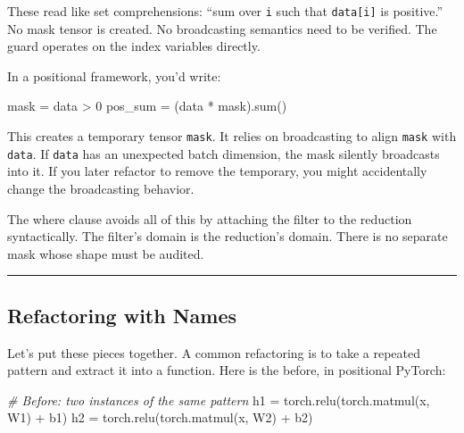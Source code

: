 \documentclass[11pt,]{article}
\newenvironment{Shaded}{}{}
\newcommand{\BuiltInTok}[1]{#1}
\newcommand{\CommentTok}[1]{\textcolor[rgb]{0.38,0.63,0.69}{\textit{#1}}}
\newcommand{\DecValTok}[1]{\textcolor[rgb]{0.25,0.63,0.44}{#1}}
\newcommand{\NormalTok}[1]{#1}
\newcommand{\OperatorTok}[1]{\textcolor[rgb]{0.40,0.40,0.40}{#1}}
\begin{document}
These read like set comprehensions: ``sum over \texttt{i} such that
\texttt{data{[}i{]}} is positive.'' No mask tensor is created. No
broadcasting semantics need to be verified. The guard operates on the
index variables directly.

In a positional framework, you'd write:

\begin{Shaded}
\begin{Highlighting}[]
\NormalTok{mask }\OperatorTok{=}\NormalTok{ data }\OperatorTok{>} \DecValTok{0}
\NormalTok{pos_sum }\OperatorTok{=}\NormalTok{ (data }\OperatorTok{*}\NormalTok{ mask).}\BuiltInTok{sum}\NormalTok{()}
\end{Highlighting}
\end{Shaded}

This creates a temporary tensor \texttt{mask}. It relies on broadcasting
to align \texttt{mask} with \texttt{data}. If \texttt{data} has an
unexpected batch dimension, the mask silently broadcasts into it. If you
later refactor to remove the temporary, you might accidentally change
the broadcasting behavior.

The where clause avoids all of this by attaching the filter to the
reduction syntactically. The filter's domain is the reduction's domain.
There is no separate mask whose shape must be audited.

\begin{center}\rule{0.5\linewidth}{0.4pt}\end{center}

\hypertarget{refactoring-with-names}{%
\subsection{Refactoring with Names}\label{refactoring-with-names}}

Let's put these pieces together. A common refactoring is to take a
repeated pattern and extract it into a function. Here is the before, in
positional PyTorch:

\begin{Shaded}
\begin{Highlighting}[]
\CommentTok{# Before: two instances of the same pattern}
\NormalTok{h1 }\OperatorTok{=}\NormalTok{ torch.relu(torch.matmul(x, W1) }\OperatorTok{+}\NormalTok{ b1)}
\NormalTok{h2 }\OperatorTok{=}\NormalTok{ torch.relu(torch.matmul(x, W2) }\OperatorTok{+}\NormalTok{ b2)}
\end{Highlighting}
\end{Shaded}
\end{document}
